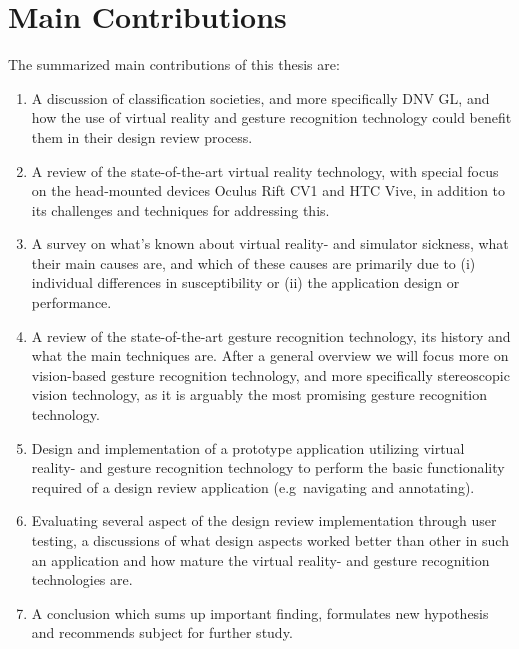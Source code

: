 \section{Main Contributions}
The summarized main contributions of this thesis are:
\begin{enumerate}
    \item A discussion of classification societies, and more specifically DNV GL, and how the use of virtual reality and gesture recognition technology could
            benefit them in their design review process.
    \item A review of the state-of-the-art virtual reality technology, with special focus on the head-mounted devices Oculus Rift CV1 and HTC Vive, 
            in addition to its challenges and techniques for addressing this.
    \item A survey on what's known about virtual reality- and simulator sickness, what their main causes are, and which of these causes are primarily due to (i) 
            individual differences in susceptibility or (ii) the application design or performance.
    \item A review of the state-of-the-art gesture recognition technology, its history and what the main techniques are. After a general overview 
            we will focus more on vision-based gesture recognition technology, and more specifically stereoscopic vision technology, 
            as it is arguably the most promising gesture recognition technology. 
    \item Design and implementation of a prototype application utilizing virtual reality- and gesture recognition technology to perform the basic functionality
          required of a design review application (e.g~navigating and annotating).
    \item Evaluating several aspect of the design review implementation through user testing, a discussions of what design aspects worked better than other
            in such an application and how mature the virtual reality- and gesture recognition technologies are.
    \item A conclusion which sums up important finding, formulates new hypothesis and recommends subject for further study.
\end{enumerate}


